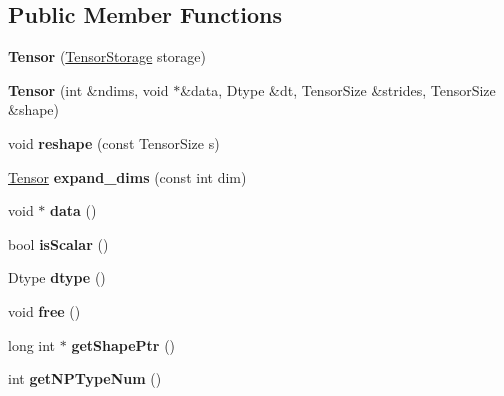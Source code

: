 \subsection*{Public Member Functions}
\begin{DoxyCompactItemize}
\item 
\mbox{\label{classsail_1_1Tensor_a777bfdb1dd5215532066436924e03856}} 
{\bfseries Tensor} (\hyperlink{classTensorStorage}{Tensor\+Storage} storage)
\item 
\mbox{\label{classsail_1_1Tensor_a127524df8b657c0109086a3a78779c34}} 
{\bfseries Tensor} (int \&ndims, void $\ast$\&data, Dtype \&dt, Tensor\+Size \&strides, Tensor\+Size \&shape)
\item 
\mbox{\label{classsail_1_1Tensor_ab502ae2dc23e1aa444f572dab0114c8b}} 
void {\bfseries reshape} (const Tensor\+Size s)
\item 
\mbox{\label{classsail_1_1Tensor_af8f4518676aae8f6a1769f42e125afaf}} 
\hyperlink{classsail_1_1Tensor}{Tensor} {\bfseries expand\+\_\+dims} (const int dim)
\item 
\mbox{\label{classsail_1_1Tensor_a98fd1ee5178b969cdd4b45a284759325}} 
void $\ast$ {\bfseries data} ()
\item 
\mbox{\label{classsail_1_1Tensor_a50a27e137b38b4a0fa7733df8c23f4ab}} 
bool {\bfseries is\+Scalar} ()
\item 
\mbox{\label{classsail_1_1Tensor_a6cf97b740b9a866db2be07aa5da4c810}} 
Dtype {\bfseries dtype} ()
\item 
\mbox{\label{classsail_1_1Tensor_a87b1a7e15afb7b621bc99828c78ad4b7}} 
void {\bfseries free} ()
\item 
\mbox{\label{classsail_1_1Tensor_a770d2fd4f131da42a50d5790af21255a}} 
long int $\ast$ {\bfseries get\+Shape\+Ptr} ()
\item 
\mbox{\label{classsail_1_1Tensor_a70b06adbeb2b2b9567fbf9fa615ebd1b}} 
int {\bfseries get\+N\+P\+Type\+Num} ()

\end{DoxyCompactItemize}
